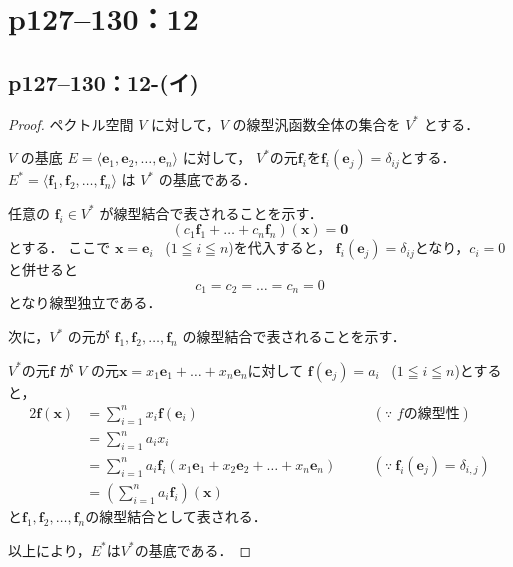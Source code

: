 \documentclass[a4paper,10pt,fleqn]{ltjsarticle}
\begin{document}
\newpage


\section*{p127--130：12}


\subsection*{p127--130：12-(イ)}


\begin{tleftbar}
    \begin{proof}
        ペクトル空間 $V$ に対して，$V$ の線型汎函数全体の集合を $V^*$ とする．

        $V$ の基底 $E= \langle \bm{e}_1, \bm{e}_2, \dots, \bm{e}_n\rangle $ に対して，
        $V^*$の元$\bm{f}_i$を$\bm{f}_i(\bm{e}_j)=\delta_{ij}$とする．
        $E^* = \langle \bm{f}_1, \bm{f}_2, \dots, \bm{f}_n\rangle$ は $V^*$ の基底である．

        任意の $\bm{f}_i  \in V^*$ が線型結合で表されることを示す．
        \[
            (c_1 \bm{f}_1 + \dots + c_n \bm{f}_n) (\bm{x}) = \bm{0}
        \]
        とする．
        ここで $\bm{x} = \bm{e}_i$ ~($1 \leqq i \leqq n$)を代入すると，
        $\bm{f}_i (\bm{e}_j) = \delta_{ij}$となり，$c_i =0$と併せると
        \[
            c_1=c_2 = \dots =c_n = 0
        \]
        となり線型独立である．

        次に，$V^\ast$ の元が $\bm{f}_1, \bm{f}_2, \dots, \bm{f}_n$ の線型結合で表されることを示す．

        $V^\ast$の元$\bm{f}$ が $V$ の元$\bm{x}=x_1 \bm{e}_1 + \dots + x_n \bm{e}_n$に対して
        $\bm{f}(\bm{e}_j) = a_i$~ ($1 \leqq i \leqq n$)とすると，
        \begin{alignat*}{2}
            \bm{f} (\bm{x}) & = \sum_{i=1}^{n} x_i \bm{f}(\bm{e}_i)                                            & \quad & (\text{$\because$~$f$の線型性})                           \\
                            & = \sum_{i=1}^{n} a_i x_i                                                         &       &                                                       \\
                            & = \sum_{i=1}^{n} a_i \bm{f}_i (x_1 \bm{e}_1 + x_2 \bm{e}_2 +\dots+ x_n \bm{e}_n) & \quad & (\text{$\because~ \bm{f}_i (\bm{e}_j)=\delta_{i,j}$}) \\
                            & = \left( \sum_{i=1}^{n} a_i \bm{f}_i \right) (\bm{x})                            &       &
        \end{alignat*}
        と$\bm{f}_1 , \bm{f}_2 , \dots ,\bm{f}_n$の線型結合として表される．

        以上により，$E^\ast$は$V^\ast$の基底である．
    \end{proof}
\end{tleftbar}
\newpage
\end{document}
